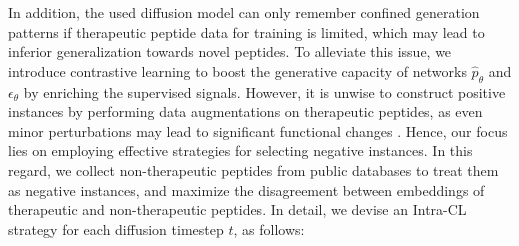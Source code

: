 \documentclass[letterpaper]{article}
\begin{document}
In addition, the used diffusion model can only remember confined generation patterns if therapeutic peptide data for training is limited, which may lead to inferior generalization towards novel peptides. To alleviate this issue, we introduce contrastive learning to boost the generative capacity of networks ${\hat{p}}_\theta$ and $\epsilon_\theta$ by enriching the supervised signals. However, it is unwise to construct positive instances by performing data augmentations on therapeutic peptides, as even minor perturbations may lead to significant functional changes \cite{yadav2022structural}. Hence, our focus lies on employing effective strategies for selecting negative instances. In this regard, we collect non-therapeutic peptides from public databases to treat them as negative instances, and maximize the disagreement between embeddings of therapeutic and non-therapeutic peptides. In detail, we devise an Intra-CL strategy for each diffusion timestep $t$, as follows:
\end{document}
